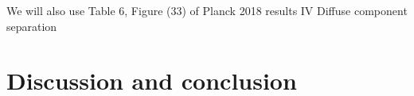 \documentclass[twocolumn]{../../common/aa}
\begin{document}



We will also use Table 6, Figure (33)
of Planck 2018 results IV Diffuse component separation

\section{Discussion and conclusion}
\label{sec:conclusion}






%




\end{document}
